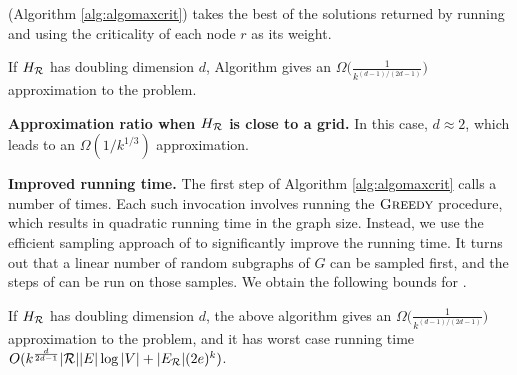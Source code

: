 (Algorithm \ref{alg:algomaxcrit}) takes the best of the solutions returned by running \algosubmod{} and \algomaxst{} using the criticality of each node $r$ as its weight. %

\begin{corollary}
\label{cor:maxcrit}
If $H_{\mathcal{R}}$ has doubling dimension $d$, Algorithm \algomaxcrit{} gives an $\Omega\Big(\frac{1}{k^{(d-1)/(2d-1)}}\Big)$ approximation to the \maxcrit{} problem. 
\end{corollary}

\noindent
\textbf{Approximation ratio when $H_{\mathcal{R}}$ is close to a grid.} In this case, $d \approx 2$, which leads to an $\Omega(1/k^{1/3})$ approximation.
\newline

\noindent
\textbf{Improved running time.} The first step of Algorithm \ref{alg:algomaxcrit}
calls \algosubmod{} a number of times. Each such invocation involves running the $\textsc{Greedy}{}$ procedure,
which results in quadratic running time in the graph size. Instead, we use the efficient sampling approach of
\cite{borgs:soda14} to significantly improve the running time. It turns out that
a linear number of random subgraphs of $G$ can be sampled first, and the steps of
\algosubmod{} can be run on those samples. We obtain the following bounds for \algomaxcrit{}. %

\begin{theorem}
\label{theorem:maxcrit}
If $H_{\mathcal{R}}$ has doubling dimension $d$, the above algorithm gives an $\Omega\Big(\frac{1}{k^{(d-1)/(2d-1)}}\Big)$ approximation to the \maxcrit{} problem, and it has worst case running time $O(k^{\frac{d}{2d-1}}|\mathcal{R}||E|\log{|V|} + |E_{\mathcal{R}}|(2e)^k)$. %
\end{theorem}

